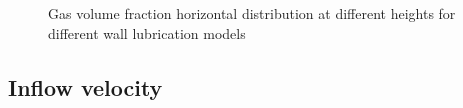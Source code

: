 \documentclass[11pt,a4paper]{article}
\begin{document}
\begin{figure}[H]
    \centering
    \caption[]{Gas volume fraction horizontal distribution at different heights for different wall lubrication models}
    \label{fig:alpha_walllub}
\end{figure}

\subsection{Inflow velocity}
\label{sub:inflow_velocity}
\end{document}
